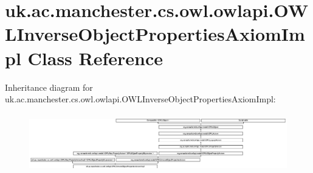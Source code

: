 \hypertarget{classuk_1_1ac_1_1manchester_1_1cs_1_1owl_1_1owlapi_1_1_o_w_l_inverse_object_properties_axiom_impl}{\section{uk.\-ac.\-manchester.\-cs.\-owl.\-owlapi.\-O\-W\-L\-Inverse\-Object\-Properties\-Axiom\-Impl Class Reference}
\label{classuk_1_1ac_1_1manchester_1_1cs_1_1owl_1_1owlapi_1_1_o_w_l_inverse_object_properties_axiom_impl}
}
Inheritance diagram for uk.\-ac.\-manchester.\-cs.\-owl.\-owlapi.\-O\-W\-L\-Inverse\-Object\-Properties\-Axiom\-Impl\-:\begin{figure}[H]
\begin{center}
\leavevmode
\includegraphics[height=2.588099cm]{classuk_1_1ac_1_1manchester_1_1cs_1_1owl_1_1owlapi_1_1_o_w_l_inverse_object_properties_axiom_impl}
\end{center}
\end{figure}

